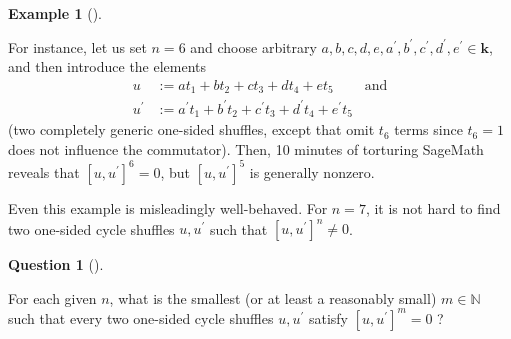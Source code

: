 \documentclass[numbers=enddot,12pt,final,onecolumn,notitlepage]{scrartcl}%
\theoremstyle{definition}
\newtheorem{quest}[theo]{Question}
\newenvironment{question}[1][]
{\begin{quest}[#1]\begin{leftbar}}
{\end{leftbar}\end{quest}}
\newtheorem{exam}[theo]{Example}
\newenvironment{example}[1][]
{\begin{exam}[#1]\begin{leftbar}}
{\end{leftbar}\end{exam}}
\newenvironment{question}[1][Question]{\noindent\textbf{#1.} }{\ \rule{0.5em}{0.5em}}
\begin{document}
\begin{example}
For instance, let us set $n=6$ and choose arbitrary $a,b,c,d,e,a^{\prime
},b^{\prime},c^{\prime},d^{\prime},e^{\prime}\in\mathbf{k}$, and then
introduce the elements%
\begin{align*}
u  &  :=at_{1}+bt_{2}+ct_{3}+dt_{4}+et_{5}\ \ \ \ \ \ \ \ \ \ \text{and}\\
u^{\prime}  &  :=a^{\prime}t_{1}+b^{\prime}t_{2}+c^{\prime}t_{3}+d^{\prime
}t_{4}+e^{\prime}t_{5}%
\end{align*}
(two completely generic one-sided shuffles, except that omit $t_{6}$ terms
since $t_{6}=1$ does not influence the commutator). Then, 10 minutes of
torturing SageMath reveals that $\left[  u,u^{\prime}\right]  ^{6}=0$, but
$\left[  u,u^{\prime}\right]  ^{5}$ is generally nonzero.
\end{example}

Even this example is misleadingly well-behaved. For $n=7$, it is not hard to
find two one-sided cycle shuffles $u,u^{\prime}$ such that $\left[
u,u^{\prime}\right]  ^{n}\neq0$.

\begin{question}
For each given $n$, what is the smallest (or at least a reasonably small)
$m\in\mathbb{N}$ such that every two one-sided cycle shuffles $u,u^{\prime}$
satisfy $\left[  u,u^{\prime}\right]  ^{m}=0$ ?
\end{question}




\end{document}
